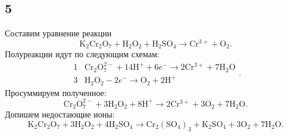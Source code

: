\subsection{5}

Составим уравнение реакции
\[
\mathrm{K_2Cr_2O_7}+\mathrm{H_2O_2}+\mathrm{H_2SO_4}\longrightarrow\mathrm{Cr^{3+}}+\mathrm{O_2}.
\]
Полуреакции идут по следующим схемам:
\[
\begin{array}{r|l}
	1 & \mathrm{Cr_2O_7^{2-}}+14\mathrm{H^+}+6e^-\longrightarrow2\mathrm{Cr^{3+}}+7\mathrm{H_2O} \\
	3 & \mathrm{H_2O_2}-2e^-\longrightarrow\mathrm{O_2} +2\mathrm{H^+}
\end{array}.
\]
Просуммируем полученное:
\[
\mathrm{Cr_2O_7^{2-}}+3\mathrm{H_2O_2}+8\mathrm{H^+}\longrightarrow2\mathrm{Cr^{3+}}+3\mathrm{O_2} +7\mathrm{H_2O}.
\]
Допишем недостающие ионы:
\[
\mathrm{K_2Cr_2O_7}+3\mathrm{H_2O_2}+4\mathrm{H_2SO_4}\longrightarrow\mathrm{Cr_2(SO_4)_3}+\mathrm{K_2SO_4}+3\mathrm{O_2} +7\mathrm{H_2O}.
\]